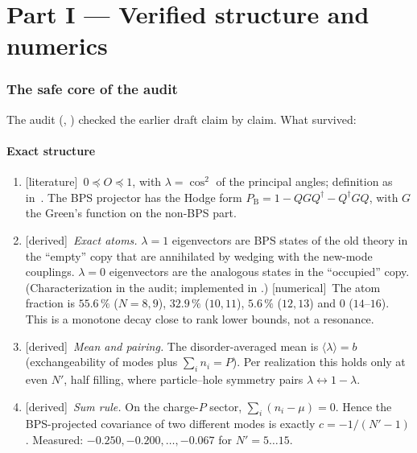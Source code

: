 \documentclass[11pt]{article}
\newcommand{\PB}{P_{\mathrm B}}
\newcommand{\Np}{N'}
\newcommand{\tagbox}[2]{\textsf{\small\color{#1}[#2]}}
\newcommand{\EST}{\tagbox{cest}{literature}}
\newcommand{\DER}{\tagbox{cder}{derived}}
\newcommand{\NUM}{\tagbox{cnum}{numerical}}
\theoremstyle{remark}
\begin{document}
\part*{Part I --- Verified structure and numerics}

\section{The safe core of the audit}\label{sec:safe}

The audit (, )
checked the earlier draft claim by claim. What survived:

\subsection{Exact structure}
\begin{enumerate}\itemsep2pt
\item \EST\ $0\preceq O\preceq 1$, with $\lambda=\cos^2$ of the principal angles; definition as in~\cite[eqs.~101--102]{CV}.
  The BPS projector has the Hodge form $\PB=1-QGQ^\dagger-Q^\dagger GQ$, with $G$ the Green's function on the
  non-BPS part.
\item \DER\ \emph{Exact atoms.} $\lambda=1$ eigenvectors are BPS states of the old theory in the ``empty'' copy that
  are annihilated by wedging with the new-mode couplings. $\lambda=0$ eigenvectors are the analogous states in the
  ``occupied'' copy. (Characterization in the audit; implemented in .)
  \NUM\ The atom fraction is $55.6\,\%$ ($N=8,9$), $32.9\,\%$ ($10,11$), $5.6\,\%$ ($12,13$) and $0$ ($14$--$16$).
  This is a monotone decay close to rank lower bounds, not a resonance.
\item \DER\ \emph{Mean and pairing.} The disorder-averaged mean is $\langle\lambda\rangle=b$ (exchangeability of
  modes plus $\sum_i n_i=P$). Per realization this holds only at even $\Np$, half filling, where particle--hole
  symmetry pairs $\lambda\leftrightarrow1-\lambda$.
\item \DER\ \emph{Sum rule.} On the charge-$P$ sector, $\sum_i(n_i-\mu)=0$. Hence the BPS-projected covariance of two
  different modes is exactly $c=-1/(\Np-1)$. Measured: $-0.250,-0.200,\ldots,-0.067$ for $\Np=5\ldots15$.
\end{enumerate}
\end{document}
